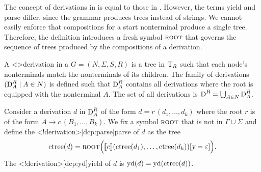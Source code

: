 \documentclass[../../document.tex]{subfiles}
\begin{document}
    The concept of derivations in  is equal to those in .
    However, the terms yield and parse differ, since the grammar produces trees instead of strings.
    We cannot easily enforce that compositions for a start nonterminal produce a single tree.
    Therefore, the definition introduces a fresh symbol \(\textsc{root}\) that governs the sequence of trees produced by the compositions of a derivation.

    \begin{definition}
        A <\dcp>{derivation} in a  \(G = (N, \varSigma, S, R)\) is a tree in \(\operatorname{T}_R\) such that each node's  nonterminals match the  nonterminals of its children.
        The family of derivations \((\operatorname{D}^R_A \mid A \in N)\) is defined such that \(\operatorname{D}^R_A\) contains all derivations where the root is equipped with the  nonterminal \(A\).
        The set of all derivations is \(\operatorname{D}^R = \bigcup_{A \in N} \operatorname{D}^R_A\).

        Consider a derivation \(d\) in \(\operatorname{D}^R_A\) of the form \(d = r\,(d_1, \ldots, d_k)\) where the root \(r\) is of the form \(A \to c\,(B_1, \ldots, B_k)\).
        We fix a symbol \(\textsc{root}\) that is not in \(\varGamma \cup \varSigma\) and define the <\dcp!derivation>[dcp:parse]{parse} of \(d\) as the tree \[
        \operatorname{ctree}(d) = \textsc{root}\Big( \llbracket c\rrbracket(\operatorname{ctree}(d_1),\ldots,\operatorname{ctree}(d_k))[\textsl{y}=\varepsilon]\Big) \text{.}
        \]
        The <\dcp!derivation>[dcp:yd]{yield} of \(d\) is \(\operatorname{yd}(d) = \operatorname{yd}(\operatorname{ctree}(d))\).
    \end{definition}
\end{document}
